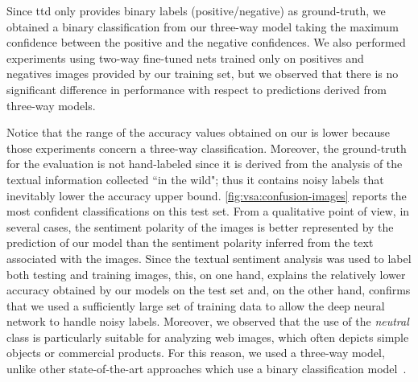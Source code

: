 Since \gls{ttd} only provides binary labels (positive/negative) as ground-truth, we obtained a binary classification from our three-way model taking the maximum confidence between the positive and the negative confidences.
We also performed experiments using two-way fine-tuned nets trained only on positives and negatives images provided by our training set, but we observed that there is no significant difference in performance with respect to predictions derived from three-way models.

Notice that the range of the accuracy values obtained on our \BTSA{} is lower because those experiments concern a three-way classification.
Moreover, the ground-truth for the evaluation is not hand-labeled since it is derived from the analysis of the textual information collected ``in the wild";
thus it contains noisy labels that inevitably lower the accuracy upper bound. %
\ref{fig:vsa:confusion-images} reports the most confident classifications on this test set.
From a qualitative point of view, in several cases, the sentiment polarity of the images is better represented by the prediction of our model than the sentiment polarity inferred from the text associated with the images.
Since the textual sentiment analysis was used to label both testing and training images, this, on one hand, explains the relatively lower accuracy obtained by our models on the \BTSA{} test set and, on the other hand, confirms that we used a sufficiently large set of training data to allow the deep neural network to handle noisy labels.
Moreover, we observed that the use of the \emph{neutral} class is particularly suitable for analyzing web images, which often depicts simple objects or commercial products.
For this reason, we used a three-way model, unlike other state-of-the-art approaches which use a binary classification model~\cite{campos2017pixels,islam2016visual,you2015robust}.


